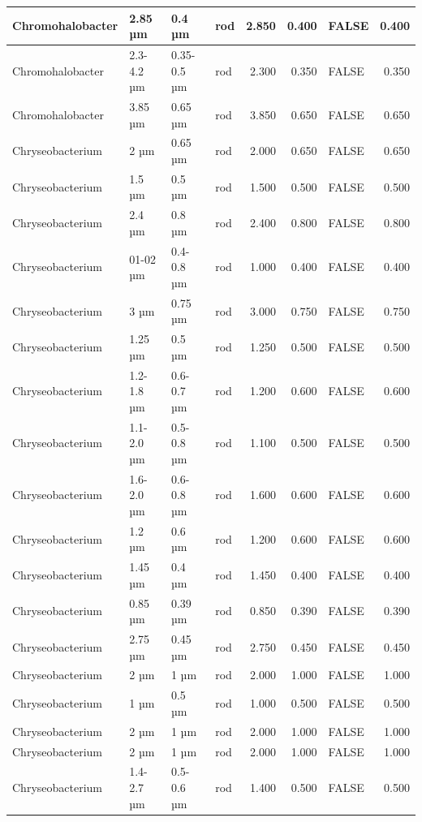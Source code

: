 \documentclass[
]{article}
\begin{document}
\begin{table}
\begin{tabular}{l|l|l|l|r|r|l|r}
\hline
Chromohalobacter & 2.85 µm & 0.4 µm & rod & 2.850 & 0.400 & FALSE & 0.400\\
\hline
Chromohalobacter & 2.3-4.2 µm & 0.35-0.5 µm & rod & 2.300 & 0.350 & FALSE & 0.350\\
\hline
Chromohalobacter & 3.85 µm & 0.65 µm & rod & 3.850 & 0.650 & FALSE & 0.650\\
\hline
Chryseobacterium & 2 µm & 0.65 µm & rod & 2.000 & 0.650 & FALSE & 0.650\\
\hline
Chryseobacterium & 1.5 µm & 0.5 µm & rod & 1.500 & 0.500 & FALSE & 0.500\\
\hline
Chryseobacterium & 2.4 µm & 0.8 µm & rod & 2.400 & 0.800 & FALSE & 0.800\\
\hline
Chryseobacterium & 01-02 µm & 0.4-0.8 µm & rod & 1.000 & 0.400 & FALSE & 0.400\\
\hline
Chryseobacterium & 3 µm & 0.75 µm & rod & 3.000 & 0.750 & FALSE & 0.750\\
\hline
Chryseobacterium & 1.25 µm & 0.5 µm & rod & 1.250 & 0.500 & FALSE & 0.500\\
\hline
Chryseobacterium & 1.2-1.8 µm & 0.6-0.7 µm & rod & 1.200 & 0.600 & FALSE & 0.600\\
\hline
Chryseobacterium & 1.1-2.0 µm & 0.5-0.8 µm & rod & 1.100 & 0.500 & FALSE & 0.500\\
\hline
Chryseobacterium & 1.6-2.0 µm & 0.6-0.8 µm & rod & 1.600 & 0.600 & FALSE & 0.600\\
\hline
Chryseobacterium & 1.2 µm & 0.6 µm & rod & 1.200 & 0.600 & FALSE & 0.600\\
\hline
Chryseobacterium & 1.45 µm & 0.4 µm & rod & 1.450 & 0.400 & FALSE & 0.400\\
\hline
Chryseobacterium & 0.85 µm & 0.39 µm & rod & 0.850 & 0.390 & FALSE & 0.390\\
\hline
Chryseobacterium & 2.75 µm & 0.45 µm & rod & 2.750 & 0.450 & FALSE & 0.450\\
\hline
Chryseobacterium & 2 µm & 1 µm & rod & 2.000 & 1.000 & FALSE & 1.000\\
\hline
Chryseobacterium & 1 µm & 0.5 µm & rod & 1.000 & 0.500 & FALSE & 0.500\\
\hline
Chryseobacterium & 2 µm & 1 µm & rod & 2.000 & 1.000 & FALSE & 1.000\\
\hline
Chryseobacterium & 2 µm & 1 µm & rod & 2.000 & 1.000 & FALSE & 1.000\\
\hline
Chryseobacterium & 1.4-2.7 µm & 0.5-0.6 µm & rod & 1.400 & 0.500 & FALSE & 0.500\\

\end{tabular}
\end{table}
\end{document}

